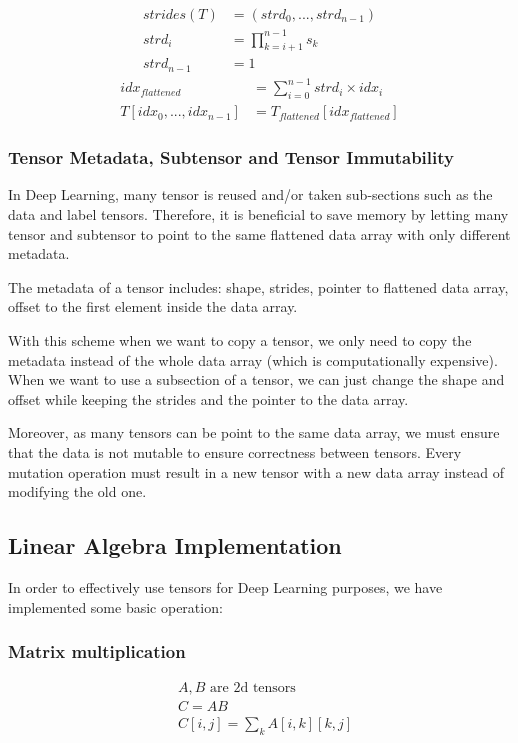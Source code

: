 \documentclass[conference]{IEEEtran}
\begin{document}
\begin{equation}
\begin{split}
strides(T) &= (strd_0, ..., strd_{n-1}) \\
strd_i &= \prod_{k=i+1}^{n-1}s_k \\ 
strd_{n-1} &= 1
\end{split}\label{strides}
\end{equation}
\begin{equation}
\begin{split}
idx_{flattened} &= \sum_{i=0}^{n-1} strd_i\times idx_i\\
T[idx_0,...,idx_{n-1}] &= T_{flattened}[idx_{flattened}]
\end{split}\label{flatten-idx}
\end{equation}

\subsubsection{Tensor Metadata, Subtensor and Tensor Immutability}
In Deep Learning, many tensor is reused and/or taken sub-sections such as the data and label tensors.
Therefore, it is beneficial to save memory by letting many tensor and subtensor to point to the same flattened data array with only different metadata.

The metadata of a tensor includes: shape, strides, pointer to flattened data array, offset to the first element inside the data array.

With this scheme when we want to copy a tensor, we only need to copy the metadata instead of the whole data array (which is computationally expensive). When we want to use a subsection of a tensor, we can just change the shape and offset while keeping the strides and the pointer to the data array.

Moreover, as many tensors can be point to the same data array, we must ensure that the data is not mutable to ensure correctness between tensors. Every mutation operation must result in a new tensor with a new data array instead of modifying the old one.
\subsection{Linear Algebra Implementation}
In order to effectively use tensors for Deep Learning purposes, we have implemented some basic operation:
\subsubsection{Matrix multiplication}
\begin{equation}
\begin{split}
&A, B \text{  are 2d tensors}\\
&C = AB\\    
&C[i,j] = \sum_k A[i,k][k,j]
\end{split}\label{matmul}
\end{equation}
\end{document}
